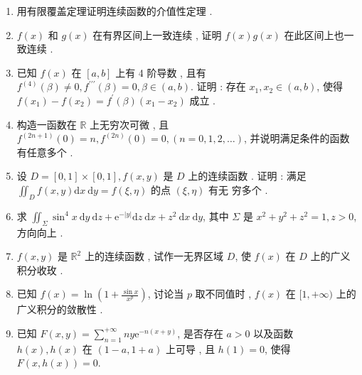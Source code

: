 \documentclass[10pt]{article}
\begin{document}
\begin{enumerate}
  \item  用有限覆盖定理证明连续函数的介值性定理 .

  \item $f(x)$  和  $g(x)$  在有界区间上一致连续 ,  证明  $f(x) g(x)$  在此区间上也一致连续 .

  \item  已知  $f(x)$  在  $[a, b]$  上有  4  阶导数 ,  且有  $f^{(4)}(\beta) \neq 0, f^{\prime \prime \prime}(\beta)=0, \beta \in(a, b)$.  证明 :  存在  $x_{1}, x_{2} \in(a, b)$,  使得  $f\left(x_{1}\right)-f\left(x_{2}\right)=f^{\prime}(\beta)\left(x_{1}-x_{2}\right)$  成立 .

  \item  构造一函数在  $\mathbb{R}$  上无穷次可微 ,  且  $f^{(2 n+1)}(0)=n, f^{(2 n)}(0)=0,(n=0,1,2, \ldots)$,  并说明满足条件的函数   有任意多个 .

  \item  设  $D=[0,1] \times[0,1], f(x, y)$  是  $D$  上的连续函数 .  证明 :  满足  $\iint_{D} f(x, y) \mathrm{d} x \mathrm{~d} y=f(\xi, \eta)$  的点  $(\xi, \eta)$  有无   穷多个 .

  \item  求  $\iint_{\Sigma} \sin ^{4} x \mathrm{~d} y \mathrm{~d} z+\mathrm{e}^{-|y|} \mathrm{d} z \mathrm{~d} x+z^{2} \mathrm{~d} x \mathrm{~d} y$,  其中  $\Sigma$  是  $x^{2}+y^{2}+z^{2}=1, z>0$,  方向向上 .

  \item $f(x, y)$  是  $\mathbb{R}^{2}$  上的连续函数 ,  试作一无界区域  $D$,  使  $f(x)$  在  $D$  上的广义积分收玫 .

  \item  已知  $f(x)=\ln \left(1+\frac{\sin x}{x^{p}}\right)$,  讨论当  $p$  取不同值时 , $f(x)$  在  $[1,+\infty)$  上的广义积分的敛散性 .

  \item  已知  $F(x, y)=\sum_{n=1}^{+\infty} n y \mathrm{e}^{-n(x+y)}$,  是否存在  $a>0$  以及函数  $h(x), h(x)$  在  $(1-a, 1+a)$  上可导 ,  且  $h(1)=0$,  使得  $F(x, h(x))=0$.


\end{enumerate}
\end{document}

